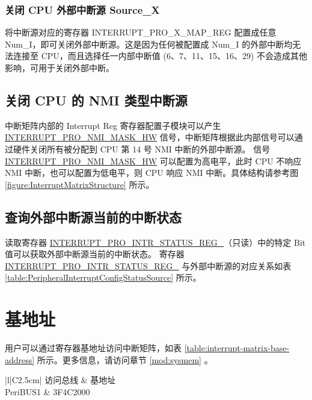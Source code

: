\documentclass[main\_\_CN.tex]{subfiles}
\begin{document}
\subsubsection{关闭 CPU 外部中断源 Source\_X}

将中断源对应的寄存器 INTERRUPT\_PRO\_X\_MAP\_REG 配置成任意 Num\_I，即可关闭外部中断源。这是因为任何被配置成 Num\_I 的外部中断均无法连接至 CPU，而且选择任一内部中断值 (6、7、11、15、16、29) 不会造成其他影响，可用于关闭外部中断。


\subsection{关闭 CPU 的 NMI 类型中断源}

中断矩阵内部的 Interrupt Reg 寄存器配置子模块可以产生 \hyperref[fielddesc:INTERRUPTPRONMIMASKHW]{INTERRUPT\_PRO\_NMI\_MASK\_HW} 信号，中断矩阵根据此内部信号可以通过硬件关闭所有被分配到 CPU 第 14 号 NMI 中断的外部中断源。
信号 \hyperref[fielddesc:INTERRUPTPRONMIMASKHW]{INTERRUPT\_PRO\_NMI\_MASK\_HW} 可以配置为高电平，此时 CPU 不响应 NMI 中断，也可以配置为低电平，则 CPU 响应 NMI 中断。具体结构请参考图 \ref{figure:InterruptMatrixStructure} 所示。


\subsection{查询外部中断源当前的中断状态}

读取寄存器 \hyperref[regdesc:INTERRUPTPROINTRSTATUSREG0REG]{INTERRUPT\_PRO\_INTR\_STATUS\_REG\_}（只读）中的特定 Bit 值可以获取外部中断源当前的中断状态。
寄存器 \hyperref[regdesc:INTERRUPTPROINTRSTATUSREG0REG]{INTERRUPT\_PRO\_INTR\_STATUS\_REG\_} 与外部中断源的对应关系如表 \ref{table:PeripheralInterruptConfigStatusSource} 所示。


\section{基地址}\label{subsection:interrupt-matrix-base-address}
用户可以通过寄存器基地址访问中断矩阵，如表 \ref{table:interrupt-matrix-base-address} 所示。更多信息，请访问章节 \ref{mod:sysmem} \textit{}。

\begin{table}[h]
    \caption{中断矩阵基地址}
    \label{table:interrupt-matrix-base-address}
    \centering

    \begin{tabular}{|l|C{2.5cm}|}
    \hline
    访问总线 & 基地址    \\
    \hline
    PeriBUS1 & \hexprefix{}3F4C2000    \\
    \hline
    \end{tabular}
\end{table}
\end{document}
